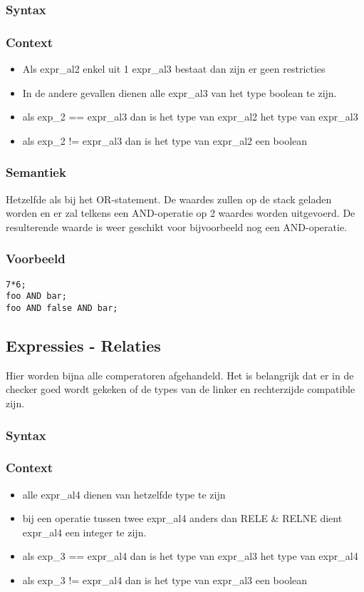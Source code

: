 \documentclass[]{article}
\begin{document}
\subsubsection{Syntax}

\subsubsection{Context}
\begin{itemize}
\item Als expr\_al2 enkel uit 1 expr\_al3 bestaat dan zijn er geen restricties
\item In de andere gevallen dienen alle expr\_al3 van het type boolean te zijn.
\item als exp\_2 == expr\_al3 dan is het type van expr\_al2 het type van expr\_al3
\item als exp\_2 != expr\_al3 dan is het type van expr\_al2 een boolean
\end{itemize}
\subsubsection{Semantiek}
Hetzelfde als bij het OR-statement. De waardes zullen op de stack geladen worden en er zal telkens een AND-operatie op 2 waardes worden uitgevoerd. De resulterende waarde is weer geschikt voor bijvoorbeeld nog een AND-operatie.
\subsubsection{Voorbeeld}
\begin{lstlisting}[style=SELMA]
7*6;
foo AND bar;
foo AND false AND bar;
\end{lstlisting}

\subsection{Expressies - Relaties}
Hier worden bijna alle comperatoren afgehandeld. Het is belangrijk dat er in de checker goed wordt gekeken of de types van de linker en rechterzijde compatible zijn.
\subsubsection{Syntax}

\subsubsection{Context}
\begin{itemize}
\item alle expr\_al4 dienen van hetzelfde type te zijn
\item bij een operatie tussen twee expr\_al4 anders dan RELE \& RELNE dient expr\_al4 een integer te zijn.
\item als exp\_3 == expr\_al4 dan is het type van expr\_al3 het type van expr\_al4
\item als exp\_3 != expr\_al4 dan is het type van expr\_al3 een boolean
\end{itemize}
\end{document}
